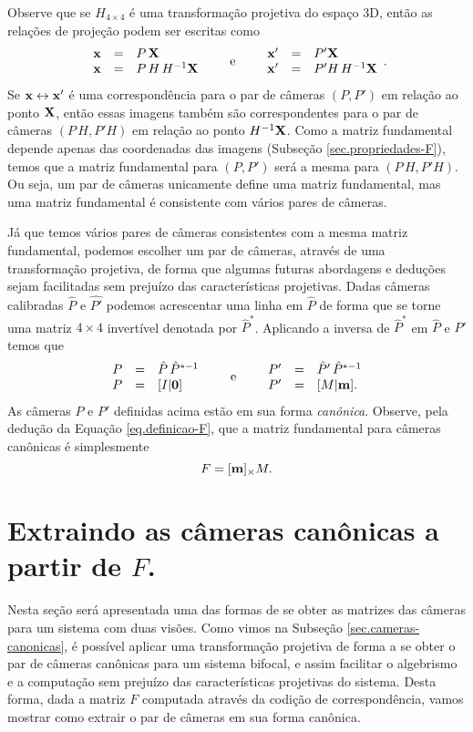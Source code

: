 Observe que se $H_{4\times4}$ é uma transformação projetiva do espaço 3D, então as relações de projeção podem ser escritas como
\begin{equation*}
\begin{array}{rcl}
\mathbf{x}&=&P\,\mathbf{X}\\
\mathbf{x}&=&P\,H\,H^{-1}\mathbf{X}
\end{array}\qquad\text{e}\qquad
\begin{array}{rcl}
\mathbf{x}'&=&P'\mathbf{X}\\
\mathbf{x}'&=&P'H\,H^{-1}\mathbf{X}
\end{array}.
\end{equation*} 
Se $\mathbf{x}\leftrightarrow\mathbf{x}'$ é uma correspondência para o par de câmeras $(P,P')$ em relação ao ponto $\mathbf{X}$, então essas imagens também são correspondentes para o par de câmeras $(P\,H,P'H)$ em relação ao ponto $H^{-1}\mathbf{X}$. Como a matriz fundamental depende apenas das coordenadas das imagens (Subseção \ref{sec.propriedades-F}), temos que a matriz fundamental para $(P,P')$ será a mesma para $(P\,H,P'H)$. Ou seja, um par de câmeras unicamente define uma matriz fundamental, mas uma matriz fundamental é consistente com vários pares de câmeras.

Já que temos vários pares de câmeras consistentes com a mesma matriz fundamental, podemos escolher um par de câmeras, através de uma transformação projetiva, de forma que algumas futuras abordagens e deduções sejam facilitadas sem prejuízo das características projetivas. Dadas câmeras calibradas $\hat{P}$ e $\hat{P'}$ podemos acrescentar uma linha em $\hat{P}$ de forma que se torne uma matriz $4\times4$ invertível denotada por $\hat{P}^*$. Aplicando a inversa de $\hat{P}^*$ em $\hat{P}$ e $\hat{P}'$ temos que
\begin{equation*}
\begin{array}{rcl}
P&=&\hat{P}\,\hat{P}^{*-1}\\
P&=&[I|{\bf 0}]
\end{array}\qquad\text{e}\qquad
\begin{array}{rcl}
P'&=&\hat{P}'\,\hat{P}^{*-1}\\
P'&=&[M|{\bf m}].
\end{array}
\end{equation*}
As câmeras $P$ e $P'$ definidas acima estão em sua forma {\it canônica}. Observe, pela dedução da Equação \ref{eq.definicao-F}, que a matriz fundamental para câmeras canônicas é simplesmente 
\begin{equation*}
F=[{\bf m}]_\times M.
\end{equation*}
\section*{Extraindo as câmeras canônicas a partir de $F$.}
Nesta seção será apresentada uma das formas de se obter as matrizes das câmeras para um sistema com duas visões. Como vimos na Subseção \ref{sec.cameras-canonicas}, é possível aplicar uma transformação projetiva de forma a se obter o par de câmeras canônicas para um sistema bifocal, e assim facilitar o algebrismo e a computação sem prejuízo das características projetivas do sistema. Desta forma, dada a matriz $F$ computada através da codição de correspondência, vamos mostrar como extrair o par de câmeras em sua forma canônica.

